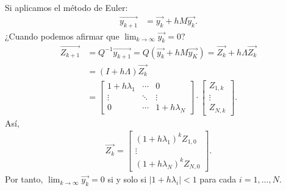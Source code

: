 Si aplicamos el método de Euler:
\begin{align*}
    \overrightarrow{y_{k+1}} &= \overrightarrow{y_k} + hM\overrightarrow{y_k}.
\end{align*}
¿Cuando podemos afirmar que $\lim_{k \to \infty} \overrightarrow{y_k} = 0$?
\begin{align*}
    \overrightarrow{Z_{k+1}} &= Q^{-1}\overrightarrow{y_{k+1}} = Q(\overrightarrow{y_{k}} + hM\overrightarrow{y_K}) = \overrightarrow{Z_k} + h\Lambda\overrightarrow{Z_k} \\
    &= (I +h\Lambda)\overrightarrow{Z_k} \\
    &= \begin{bmatrix}
1 + h\lambda_1 & \cdots & 0\\
\vdots & \ddots & \vdots \\
0 & \cdots & 1+h\lambda_N
\end{bmatrix} \cdot \begin{bmatrix}
Z_{1,k} \\
\vdots\\
Z_{N,k}
\end{bmatrix}.
\end{align*}
Así,
\begin{align*}
    \overrightarrow{Z_k} = \begin{bmatrix}
(1+h\lambda_1)^kZ_{1,0}\\
\vdots\\
(1+h\lambda_N)^kZ_{N,0}
\end{bmatrix}.
\end{align*}
Por tanto, $\lim_{k \to \infty} \overrightarrow{y_k} = 0$ si y solo si $|1+h\lambda_i|< 1 $ para cada $i = 1,\ldots,N$.

